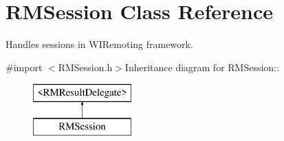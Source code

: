 \hypertarget{interface_r_m_session}{
\section{RMSession Class Reference}
\label{interface_r_m_session}
}


Handles sessions in WIRemoting framework.  


{\ttfamily \#import $<$RMSession.h$>$}Inheritance diagram for RMSession::\begin{figure}[H]
\begin{center}
\leavevmode
\includegraphics[height=2cm]{interface_r_m_session}
\end{center}
\end{figure}
